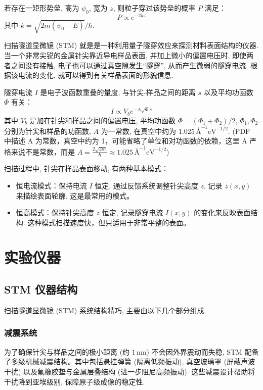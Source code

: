 \documentclass[12pt]{ctexart} %
\begin{document}
若存在一矩形势垒, 高为 \( \psi_0 \), 宽为 \( z \), 则粒子穿过该势垒的概率 \( P \) 满足：
\[ P \propto e^{-2kz} \] %
其中 \( k = \sqrt{2m(\psi_0 - E)}/\hbar \).

扫描隧道显微镜 (STM) 就是是一种利用量子隧穿效应来探测材料表面结构的仪器. 当一个非常尖锐的金属针尖靠近导电样品表面, 并加上微小的偏置电压时, 即使两者之间没有接触, 电子也可以通过真空隙发生“隧穿”, 从而产生微弱的隧穿电流. 根据该电流的变化, 就可以得到有关样品表面的形貌信息.

隧穿电流 \( I \) 是电子波函数重叠的量度, 与针尖-样品之间的距离 \( s \) 以及平均功函数 \( \Phi \) 有关：
\[ I \propto V_b e^{-A\sqrt{\Phi}s} \] %
其中 \( V_b \) 是加在针尖和样品之间的偏置电压, 平均功函数 \( \Phi = (\Phi_1 + \Phi_2)/2 \), \( \Phi_1, \Phi_2 \) 分别为针尖和样品的功函数, \( A \) 为一常数, 在真空中约为 \( 1.025 \, \text{Å}^{-1}\text{eV}^{-1/2} \). (PDF 中描述 A 为常数，真空中约为 1，可能省略了单位和对功函数的依赖，这里 A 严格来说不是常数，而是 \( A = \frac{2\sqrt{2m}}{\hbar} \approx 1.025 \, \text{Å}^{-1}\text{eV}^{-1/2} \))

扫描过程中, 针尖在样品表面移动, 有两种基本模式：
\begin{itemize}
    \item 恒电流模式：保持电流 \( I \) 恒定, 通过反馈系统调整针尖高度 \( z \), 记录 \( z(x, y) \) 来描绘表面轮廓. 这是最常用的模式。
    \item 恒高模式：保持针尖高度 \( z \) 恒定, 记录隧穿电流 \( I(x, y) \) 的变化来反映表面结构. 这种模式扫描速度快，但只适用于非常平整的表面。
\end{itemize}

\section{实验仪器}
\subsection{STM 仪器结构}
扫描隧道显微镜 (STM) 系统结构精巧, 主要由以下几个部分组成.

\subsubsection{减震系统}
为了确保针尖与样品之间的极小距离 (约 \( 1 \, \text{nm} \)) 不会因外界震动而失稳, STM 配备了多级机械减震结构。其中包括悬挂弹簧 (隔离低频振动), 真空玻璃罩 (屏蔽声波干扰) 以及氟橡胶垫与金属层叠结构 (进一步阻尼高频振动). 这些减震设计帮助将干扰降到亚埃级别, 保障原子级成像的稳定性.
\end{document}
